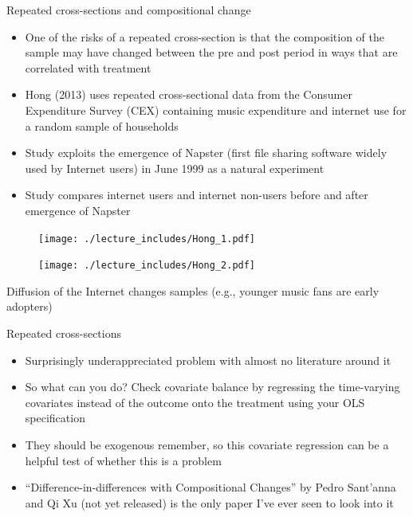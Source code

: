\documentclass{beamer}
\begin{document}
\begin{frame}{Repeated cross-sections and compositional change}
	
	\begin{itemize}
	\item One of the risks of a repeated cross-section is that the composition of the sample may have changed between the pre and post period in ways that are correlated with treatment
	\item Hong (2013) uses repeated cross-sectional data from the Consumer Expenditure Survey (CEX) containing music expenditure and internet use for a random sample of households
	\item Study exploits the emergence of Napster (first file sharing software widely used by Internet users) in June 1999 as a natural experiment
	\item Study compares internet users and internet non-users before and after emergence of Napster
	\end{itemize}

\end{frame}

\begin{frame}[plain]
	\begin{figure}
	\texttt{[image: ./lecture\_includes/Hong\_1.pdf]}
	\end{figure}
	
\end{frame}

\begin{frame}[shrink=20,plain]
	\begin{figure}
	\texttt{[image: ./lecture\_includes/Hong\_2.pdf]}
	\end{figure}
	
	Diffusion of the Internet changes samples (e.g., younger music fans are early adopters)
	
\end{frame}

\begin{frame}{Repeated cross-sections}

\begin{itemize}
\item Surprisingly underappreciated problem with almost no literature around it
\item So what can you do?  Check covariate balance by regressing the time-varying covariates instead of the outcome onto the treatment using your OLS specification
\item They should be exogenous remember, so this covariate regression can be a helpful test of whether this is a problem
\item ``Difference-in-differences with Compositional Changes'' by Pedro Sant'anna and Qi Xu (not yet released) is the only paper I've ever seen to look into it
\end{itemize}

\end{frame}
\end{document}
